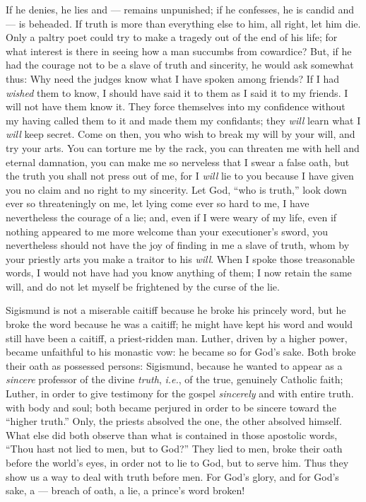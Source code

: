 If he denies, he lies and --- remains unpunished; if he confesses, he is candid 
and --- is beheaded. If truth is more than everything else to him, all right, 
let him die. Only a paltry poet could try to make a tragedy out of the end of 
his life; for what interest is there in seeing how a man succumbs from 
cowardice? But, if he had the courage not to be a slave of truth and 
sincerity, he would ask somewhat thus: Why need the judges know what I have 
spoken among friends? If I had \textit{wished} them to know, I should have 
said it to them as I said it to my friends. I will not have them know it. They 
force themselves into my confidence without my having called them to it and 
made them my confidants; they \textit{will} learn what I \textit{will} keep 
secret. Come on then, you who wish to break my will by your will, and try your 
arts. You can torture me by the rack, you can threaten me with hell and 
eternal damnation, you can make me so nerveless that I swear a false oath, but 
the truth you shall not press out of me, for I \textit{will} lie to you 
because I have given you no claim and no right to my sincerity. Let God, 
``who is truth,'' look down ever so threateningly on me, let lying come ever 
so hard to me, I have nevertheless the courage of a lie; and, even if I were 
weary of my life, even if nothing appeared to me more welcome than your 
executioner's sword, you nevertheless should not have the joy of finding in me 
a slave of truth, whom by your priestly arts you make a traitor to his 
\textit{will}. When I spoke those treasonable words, I would not have had you 
know anything of them; I now retain the same will, and do not let myself be 
frightened by the curse of the lie.

Sigismund is not a miserable caitiff because he broke his princely word, but 
he broke the word because he was a caitiff; he might have kept his word and 
would still have been a caitiff, a priest-ridden man. Luther, driven by a 
higher power, became unfaithful to his monastic vow: he became so for God's 
sake. Both broke their oath as possessed persons: Sigismund, because he wanted 
to appear as a \textit{sincere} professor of the divine \textit{truth}, 
\textit{i.e.}, of the true, genuinely Catholic faith; Luther, in order to 
give testimony for the gospel \textit{sincerely} and with entire truth. with 
body and soul; both became perjured in order to be sincere toward the 
``higher truth.'' Only, the priests absolved the one, the other absolved 
himself. What else did both observe than what is contained in those apostolic 
words, ``Thou hast not lied to men, but to God?'' They lied to men, broke 
their oath before the world's eyes, in order not to lie to God, but to serve 
him. Thus they show us a way to deal with truth before men. For God's glory, 
and for God's sake, a --- breach of oath, a lie, a prince's word broken!

